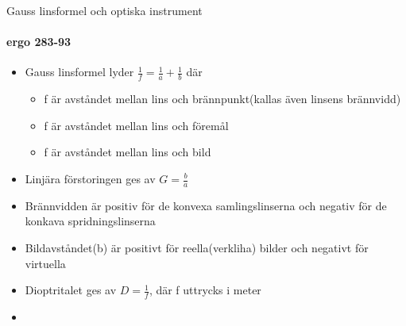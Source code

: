 \documentclass{beamer}
\begin{document}
\begin{frame}{Gauss linsformel och optiska instrument}
\framesubtitle{ergo 283-93}

  \begin{itemize}
    \item \alert{Gauss linsformel} lyder $\frac{1}{f}=\frac{1}{a}+\frac{1}{b}$
    d\"ar 
\begin{itemize}
\item f \"ar avst\aa ndet mellan lins och br\"annpunkt(kallas \"aven linsens br\"annvidd)
\item f \"ar avst\aa ndet mellan lins och f\"orem\aa l
\item f \"ar avst\aa ndet mellan lins och bild
\end{itemize}
    \item \alert{Linj\"ara f\"orstoringen } ges av $G=\frac{b}{a}$
    \item Br\"annvidden \"ar positiv f\"or de konvexa samlingslinserna och negativ f\"or de konkava spridningslinserna
    \item Bildavst\aa ndet(b) \"ar positivt f\"or reella(verkliha) bilder och negativt f\"or virtuella
    \item \alert{Dioptritalet} ges av $D=\frac{1}{f}$, d\"ar f uttrycks i meter
    \item 
  \end{itemize}
  
  

\end{frame}
\end{document}
